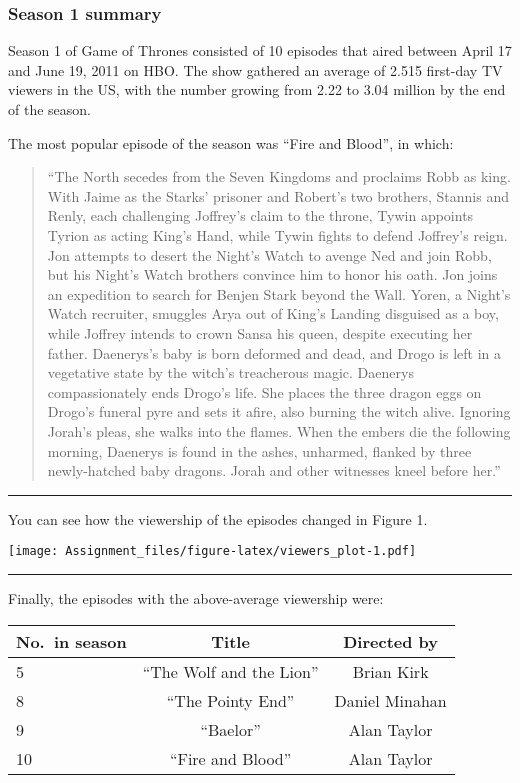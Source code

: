 \documentclass[
]{article}
\begin{document}
\hypertarget{season-1-summary}{%
\subsubsection{Season 1 summary}\label{season-1-summary}}

Season 1 of Game of Thrones consisted of 10 episodes that aired between
April 17 and June 19, 2011 on HBO. The show gathered an average of 2.515
first-day TV viewers in the US, with the number growing from 2.22 to
3.04 million by the end of the season.

The most popular episode of the season was ``Fire and Blood'', in which:

\begin{quote}
``The North secedes from the Seven Kingdoms and proclaims Robb as king.
With Jaime as the Starks' prisoner and Robert's two brothers, Stannis
and Renly, each challenging Joffrey's claim to the throne, Tywin
appoints Tyrion as acting King's Hand, while Tywin fights to defend
Joffrey's reign. Jon attempts to desert the Night's Watch to avenge Ned
and join Robb, but his Night's Watch brothers convince him to honor his
oath. Jon joins an expedition to search for Benjen Stark beyond the
Wall. Yoren, a Night's Watch recruiter, smuggles Arya out of King's
Landing disguised as a boy, while Joffrey intends to crown Sansa his
queen, despite executing her father. Daenerys's baby is born deformed
and dead, and Drogo is left in a vegetative state by the witch's
treacherous magic. Daenerys compassionately ends Drogo's life. She
places the three dragon eggs on Drogo's funeral pyre and sets it afire,
also burning the witch alive. Ignoring Jorah's pleas, she walks into the
flames. When the embers die the following morning, Daenerys is found in
the ashes, unharmed, flanked by three newly-hatched baby dragons. Jorah
and other witnesses kneel before her.''
\end{quote}

\begin{center}\rule{0.5\linewidth}{0.5pt}\end{center}

You can see how the viewership of the episodes changed in Figure 1.

\texttt{[image: Assignment\_files/figure-latex/viewers\_plot-1.pdf]}

\begin{center}\rule{0.5\linewidth}{0.5pt}\end{center}

Finally, the episodes with the above-average viewership were:

\begin{longtable}[]{@{}lcc@{}}
\toprule()
No.~in season & Title & Directed by \\
\midrule()
\endhead
5 & ``The Wolf and the Lion'' & Brian Kirk \\
8 & ``The Pointy End'' & Daniel Minahan \\
9 & ``Baelor'' & Alan Taylor \\
10 & ``Fire and Blood'' & Alan Taylor \\
\bottomrule()
\end{longtable}
\end{document}
